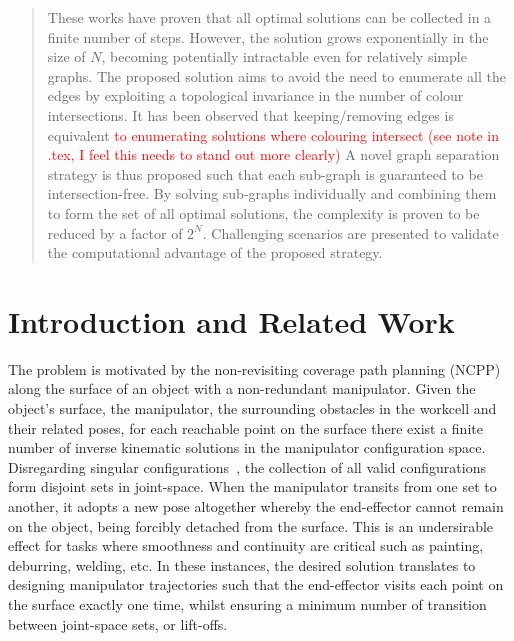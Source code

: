 \documentclass[conference]{IEEEtran}
\begin{document}
\begin{abstract}
These works have proven that all optimal solutions can be collected in a finite number of steps. However, the solution grows exponentially in the size of $N$, becoming potentially intractable even for relatively simple graphs.
The proposed solution aims to avoid the need to enumerate all %
the edges by exploiting a topological invariance in the number of colour intersections. It has been observed that keeping/removing edges is equivalent  \textcolor{red}{to enumerating  solutions where colouring intersect (see note in .tex, I feel this needs to stand out more clearly)}
A novel graph separation strategy is thus proposed such that each sub-graph is guaranteed to be intersection-free. By solving sub-graphs individually and combining them to form the set of all optimal solutions, the complexity is proven to be reduced by a factor of $2^N$. Challenging scenarios are presented to validate the computational advantage of the proposed strategy.
\end{abstract}

\IEEEpeerreviewmaketitle

\section{Introduction and Related Work}
The problem is motivated by the non-revisiting coverage path planning (NCPP) along the surface of an object with a non-redundant manipulator. 
Given the object's surface, the manipulator, 
the surrounding obstacles in the workcell and their related poses, for each reachable point on the surface there exist a finite number of inverse kinematic solutions in the manipulator configuration space. 
Disregarding singular configurations~\cite{Yoshikawa1990Translational}, the collection of all valid configurations form disjoint sets in joint-space. When the manipulator transits from one set to another, it adopts a new pose altogether whereby the end-effector cannot remain on the object, being forcibly detached from the surface. This is an undersirable effect for tasks where smoothness and continuity are critical such as painting, deburring, welding, etc. 
In these instances, the desired solution translates to designing manipulator trajectories such that the end-effector visits each point on the surface exactly one time, whilst ensuring a minimum number of transition between joint-space sets, or lift-offs. 
\end{document}
